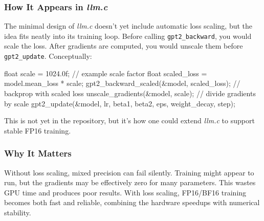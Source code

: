 \documentclass[
  letterpaper,
  DIV=11,
  numbers=noendperiod]{scrreprt}
\newenvironment{Shaded}{\begin{snugshade}}{\end{snugshade}}
\newcommand{\BuiltInTok}[1]{\textcolor[rgb]{0.00,0.23,0.31}{#1}}
\newcommand{\CommentTok}[1]{\textcolor[rgb]{0.37,0.37,0.37}{#1}}
\newcommand{\DataTypeTok}[1]{\textcolor[rgb]{0.68,0.00,0.00}{#1}}
\newcommand{\FloatTok}[1]{\textcolor[rgb]{0.68,0.00,0.00}{#1}}
\newcommand{\NormalTok}[1]{\textcolor[rgb]{0.00,0.23,0.31}{#1}}
\newcommand{\OperatorTok}[1]{\textcolor[rgb]{0.37,0.37,0.37}{#1}}
\begin{document}
\subsubsection{\texorpdfstring{How It Appears in
\emph{llm.c}}{How It Appears in llm.c}}\label{how-it-appears-in-llm.c}

The minimal design of \emph{llm.c} doesn't yet include automatic loss
scaling, but the idea fits neatly into its training loop. Before calling
\texttt{gpt2\_backward}, you would scale the loss. After gradients are
computed, you would unscale them before \texttt{gpt2\_update}.
Conceptually:

\begin{Shaded}
\begin{Highlighting}[]
\DataTypeTok{float}\NormalTok{ scale }\OperatorTok{=} \FloatTok{1024.0}\BuiltInTok{f}\OperatorTok{;} \CommentTok{// example scale factor}
\DataTypeTok{float}\NormalTok{ scaled\_loss }\OperatorTok{=}\NormalTok{ model}\OperatorTok{.}\NormalTok{mean\_loss }\OperatorTok{*}\NormalTok{ scale}\OperatorTok{;}
\NormalTok{gpt2\_backward\_scaled}\OperatorTok{(\&}\NormalTok{model}\OperatorTok{,}\NormalTok{ scaled\_loss}\OperatorTok{);} \CommentTok{// backprop with scaled loss}
\NormalTok{unscale\_gradients}\OperatorTok{(\&}\NormalTok{model}\OperatorTok{,}\NormalTok{ scale}\OperatorTok{);} \CommentTok{// divide gradients by scale}
\NormalTok{gpt2\_update}\OperatorTok{(\&}\NormalTok{model}\OperatorTok{,}\NormalTok{ lr}\OperatorTok{,}\NormalTok{ beta1}\OperatorTok{,}\NormalTok{ beta2}\OperatorTok{,}\NormalTok{ eps}\OperatorTok{,}\NormalTok{ weight\_decay}\OperatorTok{,}\NormalTok{ step}\OperatorTok{);}
\end{Highlighting}
\end{Shaded}

This is not yet in the repository, but it's how one could extend
\emph{llm.c} to support stable FP16 training.

\subsubsection{Why It Matters}\label{why-it-matters-41}

Without loss scaling, mixed precision can fail silently. Training might
appear to run, but the gradients may be effectively zero for many
parameters. This wastes GPU time and produces poor results. With loss
scaling, FP16/BF16 training becomes both fast and reliable, combining
the hardware speedups with numerical stability.
\end{document}
